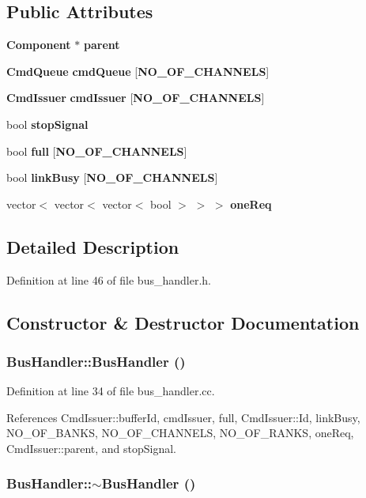 \subsection*{Public Attributes}
\begin{CompactItemize}
\item 
{\bf Component} $\ast$ {\bf parent}
\item 
{\bf CmdQueue} {\bf cmdQueue} [{\bf NO\_\-OF\_\-CHANNELS}]
\item 
{\bf CmdIssuer} {\bf cmdIssuer} [{\bf NO\_\-OF\_\-CHANNELS}]
\item 
bool {\bf stopSignal}
\item 
bool {\bf full} [{\bf NO\_\-OF\_\-CHANNELS}]
\item 
bool {\bf linkBusy} [{\bf NO\_\-OF\_\-CHANNELS}]
\item 
vector$<$ vector$<$ vector$<$ bool $>$ $>$ $>$ {\bf oneReq}
\end{CompactItemize}


\subsection{Detailed Description}


Definition at line 46 of file bus\_\-handler.h.

\subsection{Constructor \& Destructor Documentation}
\subsubsection[{BusHandler}]{\setlength{\rightskip}{0pt plus 5cm}BusHandler::BusHandler ()}\label{classBusHandler_8e0f1cd4cc53c51152413eb19a0a5c63}




Definition at line 34 of file bus\_\-handler.cc.

References CmdIssuer::bufferId, cmdIssuer, full, CmdIssuer::Id, linkBusy, NO\_\-OF\_\-BANKS, NO\_\-OF\_\-CHANNELS, NO\_\-OF\_\-RANKS, oneReq, CmdIssuer::parent, and stopSignal.
\subsubsection[{$\sim$BusHandler}]{\setlength{\rightskip}{0pt plus 5cm}BusHandler::$\sim$BusHandler ()}\label{classBusHandler_4167c4a5b3fed2e3c90dfb55ae051d38}




